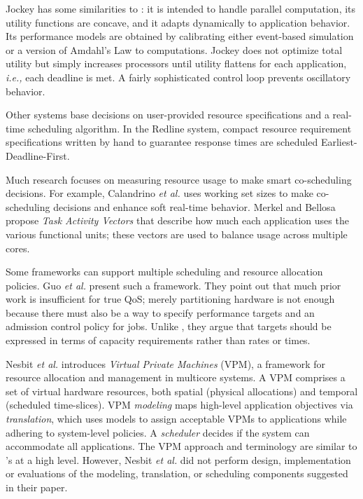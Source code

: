 Jockey\cite{Jockey} has some similarities to \pacora: it is intended to handle parallel computation, its utility functions are concave,
and it adapts dynamically to application behavior.
Its performance models are obtained by calibrating either event-based simulation or a version of Amdahl's Law to computations.
Jockey does not optimize total utility but simply increases processors until utility flattens for each application,
\emph{i.e.,} each deadline is met.
A fairly sophisticated control loop prevents oscillatory behavior.

Other systems base decisions on user-provided resource specifications and a real-time scheduling algorithm.  In the Redline system\cite{Redline}, compact resource requirement specifications written by hand to guarantee response times are scheduled Earliest-Deadline-First.

Much research focuses on measuring resource usage to make smart co-scheduling decisions.
For example, Calandrino \emph{et al.}\cite{unc} uses working set sizes to make co-scheduling decisions and enhance soft real-time behavior. Merkel and Bellosa\cite{merkel-eurosys08} propose \emph{Task Activity Vectors} that describe how much each application uses the various functional units; these vectors are used to balance usage across multiple cores.

 Some frameworks can support multiple scheduling and resource allocation policies. Guo \emph{et al.}\cite{1331730} present such a framework.  They point out that much prior work is insufficient for true QoS; merely partitioning hardware is not enough because there must also be a way to specify performance targets and an admission control policy for jobs. Unlike \pacora, they argue that targets should be expressed in terms of capacity requirements rather than rates or times.

Nesbit \emph{et al.}\cite{1436097} introduces \emph{Virtual Private Machines} (VPM), a framework for resource allocation and management in multicore systems. A VPM comprises a set of virtual hardware resources, both spatial (physical allocations) and temporal (scheduled time-slices).
VPM \emph{modeling} maps high-level application objectives via \emph{translation}, which uses models to assign acceptable VPMs to applications while adhering to system-level policies. A \emph{scheduler} decides if the system can accommodate all applications. The VPM approach and terminology are similar to \pacora's at a high level.  However, Nesbit \emph{et al.} did not perform design, implementation or evaluations of the modeling, translation, or scheduling components suggested in their paper.

